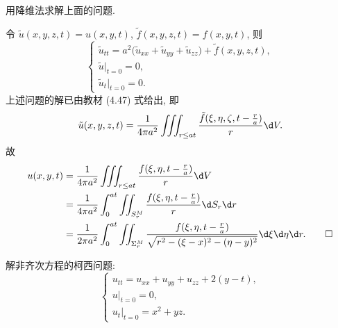 \begin{exercise}
  用降维法求解上面的问题.
\end{exercise}

\begin{solve}
  令 $\tilde{u}(x,y,z,t) = u(x,y,t)$, $\tilde{f}(x,y,z,t)=f(x,y,t)$, 则
  \[\begin{cases}
    \tilde{u}_{tt} = a^2\bigl(\tilde{u}_{xx}+\tilde{u}_{yy}+\tilde{u}_{zz}\bigr)
      + \tilde{f}(x,y,z,t), \\
    \tilde{u}|_{t=0} = 0, \\
    \tilde{u}_t|_{t=0} = 0.
  \end{cases}\]
  上述问题的解已由教材 (4.47) 式给出, 即
  \[\tilde{u}(x,y,z,t)
    = \frac{1}{4\pi a^2}\iiint_{r\leq at} 
      \frac{\tilde{f}(\xi,\eta,\zeta,t-\frac{r}{a})}{r}\d V.\]
  故
  \begin{align*}
    u(x,y,t)
    & = \frac{1}{4\pi a^2}\iiint_{r\leq at} \frac{f(\xi,\eta,t-\frac{r}{a})}{r}\d V \\
    & = \frac{1}{4\pi a^2}\int_0^{at} 
      \iint_{S_r^M} \frac{f(\xi, \eta, t-\frac{r}{a})}{r}\d S_r \d r \\
    & = \frac{1}{2\pi a^2} \int_0^{at} \iint_{\Sigma_r^M} \frac{f(\xi,\eta,t-\frac{r}{a})}
      {\sqrt{r^2-(\xi-x)^2-(\eta-y)^2}}\d\xi\d\eta\d r.\qedhere
  \end{align*}
\end{solve}


\begin{exercise}[8]
  解非齐次方程的柯西问题:
  \[\begin{cases}
    u_{tt} = u_{xx}+u_{yy}+u_{zz}+2(y-t), \\
    u|_{t=0} = 0, \\
    u_t|_{t=0} = x^2+yz.
  \end{cases}\]
\end{exercise}

